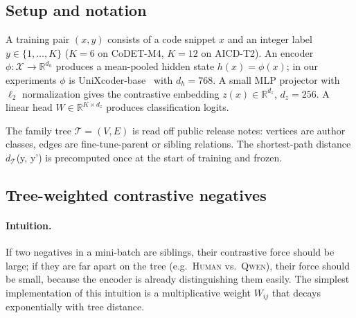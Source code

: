 ﻿\documentclass[11pt]{article}
\newcommand{\sib}{\ensuremath{d_{\mathcal{T}}}\xspace}
\begin{document}
\subsection{Setup and notation}
\label{sec:method-setup}

A training pair $(x, y)$ consists of a code snippet $x$ and an
integer label $y \in \{1, \dots, K\}$ ($K{=}6$ on CoDET-M4,
$K{=}12$ on AICD-T2). An encoder
$\phi : \mathcal{X} \to \mathbb{R}^{d_h}$ produces a mean-pooled
hidden state $h(x) = \phi(x)$; in our experiments $\phi$ is
UniXcoder-base~\citep{guo2022unixcoder} with $d_h{=}768$. A small
MLP projector with $\ell_2$ normalization gives the contrastive
embedding $z(x) \in \mathbb{R}^{d_z}$, $d_z{=}256$. A linear head
$W \in \mathbb{R}^{K \times d_z}$ produces classification logits.

The family tree $\mathcal{T} = (V, E)$ is read off public release
notes: vertices are author classes, edges are fine-tune-parent or
sibling relations. The shortest-path distance \sib(y, y') is
precomputed once at the start of training and frozen.

\subsection{Tree-weighted contrastive negatives}
\label{sec:method-loss}

\paragraph{Intuition.} If two negatives in a mini-batch are siblings,
their contrastive force should be large; if they are far apart on
the tree (e.g.\ \textsc{Human} vs.\ \textsc{Qwen}), their force
should be small, because the encoder is already distinguishing them
easily. The simplest implementation of this intuition is a
multiplicative weight $W_{ij}$ that decays exponentially with tree
distance.
\end{document}
